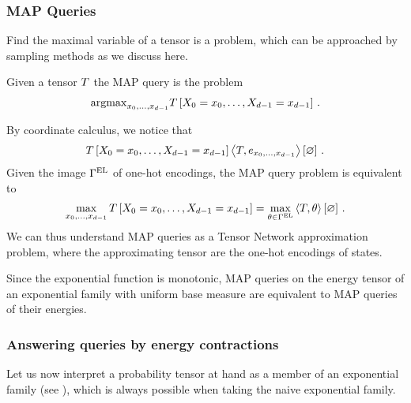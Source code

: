 \subsubsection{MAP Queries}

Find the maximal variable of a tensor is a problem, which can be approached by sampling methods as we discuss here.

\begin{definition}
	Given a tensor $T$ the MAP query is the problem 
	\begin{align}
		\mathrm{argmax}_{x_{0},\ldots,x_{d-1}} T\left[X_{0}=x_{0},\ldots,X_{d-1}=x_{d-1}\right] \, .
	\end{align}
\end{definition}


By coordinate calculus, we notice that
\begin{align}
	T\left[X_{0}=x_{0},\ldots,X_{d-1}=x_{d-1}\right] 
	\left\langle T, e_{x_{0},\ldots,x_{d-1}}\right\rangle \left[ \varnothing \right] \, .
\end{align}
Given the image $\Gamma^{\mathrm{EL}}$ of one-hot encodings, the MAP query problem is equivalent to 
\begin{align}
	\max_{x_{0},\ldots,x_{d-1}} T\left[X_{0}=x_{0},\ldots,X_{d-1}=x_{d-1}\right] 
	= \max_{\theta\in\Gamma^{\mathrm{EL}}} \left\langle T, \theta\right\rangle \left[ \varnothing \right] \, .
\end{align}
We can thus understand MAP queries as a Tensor Network approximation problem, where the approximating tensor are the one-hot encodings of states.

\begin{remark}
	Since the exponential function is monotonic, MAP queries on the energy tensor of an exponential family with uniform base measure are equivalent to MAP queries of their energies.
\end{remark}


\subsubsection{Answering queries by energy contractions}

Let us now interpret a probability tensor at hand as a member of an exponential family (see ), which is always possible when taking the naive exponential family.

